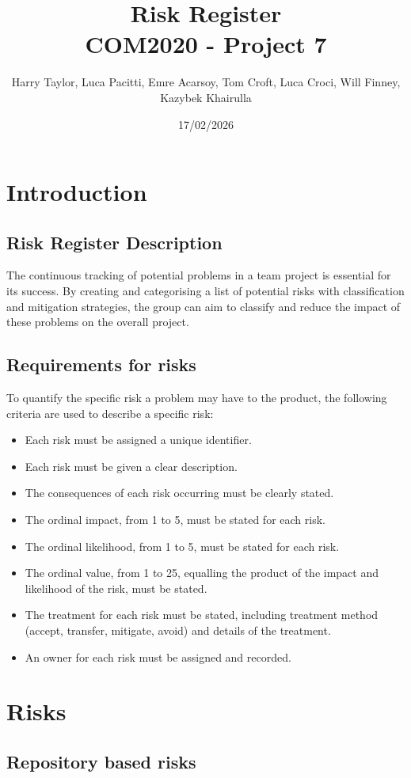 \documentclass[11pt]{article}
\title{Risk Register\\[0.3em]
\large COM2020 - Project 7}
\author{Harry Taylor, Luca Pacitti, Emre Acarsoy, Tom Croft, Luca Croci, Will Finney, \\ Kazybek Khairulla}
\date{17/02/2026}
\begin{document}
\maketitle
\newpage
\tableofcontents
\newpage
\section{Introduction}
\subsection{Risk Register Description}
The continuous tracking of potential problems in a team project is essential for its success. By creating and categorising a list of potential risks with classification and mitigation strategies, the group can aim to classify and reduce the impact of these problems on the overall project.
\subsection{Requirements for risks}
To quantify the specific risk a problem may have to the product, the following criteria are used to describe a specific risk:
\begin{itemize}
    \item Each risk must be assigned a unique identifier.
    \item Each risk must be given a clear description.
    \item The consequences of each risk occurring must be clearly stated.
    \item The ordinal impact, from 1 to 5, must be stated for each risk.
    \item The ordinal likelihood, from 1 to 5, must be stated for each risk.
    \item The ordinal value, from 1 to 25, equalling the product of the impact and likelihood of the risk, must be stated.
    \item The treatment for each risk must be stated, including treatment method (accept, transfer, mitigate, avoid) and details of the treatment. 
    \item An owner for each risk must be assigned and recorded.
\end{itemize}
\section{Risks}
\subsection{Repository based risks}
\end{document}
